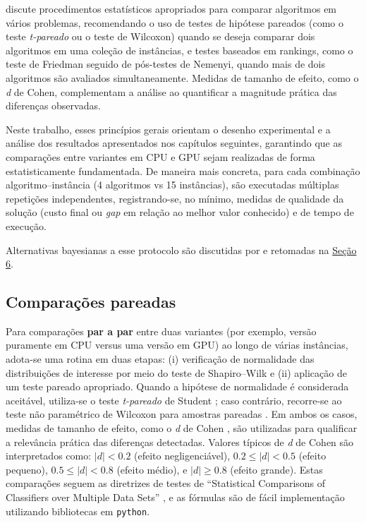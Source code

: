 \textcite{demsar2006statistical} discute procedimentos estatísticos
apropriados para comparar algoritmos em vários problemas, recomendando o
uso de testes de hipótese pareados (como o teste \emph{t-pareado} ou o
teste de Wilcoxon) quando se deseja comparar dois algoritmos em uma
coleção de instâncias, e testes baseados em rankings, como o teste de
Friedman seguido de pós-testes de Nemenyi, quando mais de dois
algoritmos são avaliados simultaneamente. Medidas de tamanho de efeito,
como o \emph{d} de Cohen, complementam a análise ao quantificar a
magnitude prática das diferenças observadas.

Neste trabalho, esses princípios gerais orientam o desenho experimental
e a análise dos resultados apresentados nos capítulos seguintes,
garantindo que as comparações entre variantes em CPU e GPU sejam
realizadas de forma estatisticamente fundamentada. De maneira mais
concreta, para cada combinação algoritmo--instância (4 algoritmos vs 15
instâncias), são executadas múltiplas repetições independentes,
registrando-se, no mínimo, medidas de qualidade da solução (custo final
ou \emph{gap} em relação ao melhor valor conhecido) e de tempo de
execução.

Alternativas bayesianas a esse protocolo são discutidas por \textcite{benavoli2017time} e retomadas na \hyperref[sec-64-trabalhos-futuros]{Seção 6}.

\subsection{Comparações pareadas}\label{sec-271-comparacoes-pareadas}

Para comparações \textbf{par a par} entre duas variantes (por exemplo,
versão puramente em CPU versus uma versão em GPU) ao longo de várias
instâncias, adota-se
uma rotina em duas etapas: (i) verificação de normalidade das
distribuições de interesse por meio do teste de Shapiro--Wilk
\autocite{shapiro1965analysis} e (ii) aplicação de um teste pareado
apropriado. Quando a hipótese de normalidade é considerada aceitável,
utiliza-se o teste \emph{t-pareado} de Student
\autocite{student1908probable}; caso contrário, recorre-se ao teste não
paramétrico de Wilcoxon para amostras pareadas
\autocite{wilcoxon1945individual}. Em ambos os casos, medidas de tamanho
de efeito, como o \emph{d} de Cohen \autocite{cohen1988statistical}, são
utilizadas para qualificar a relevância prática das diferenças
detectadas. Valores típicos de \emph{d} de Cohen são interpretados como:
\(|d| < 0.2\) (efeito negligenciável), \(0.2 \le |d| < 0.5\) (efeito
pequeno), \(0.5 \le |d| < 0.8\) (efeito médio), e \(|d| \ge 0.8\)
(efeito grande). Estas comparações seguem as diretrizes de testes de
``Statistical Comparisons of Classifiers over Multiple Data Sets''
\autocite{demsar2006statistical}, e as fórmulas são de fácil
implementação utilizando bibliotecas em \texttt{python}.

